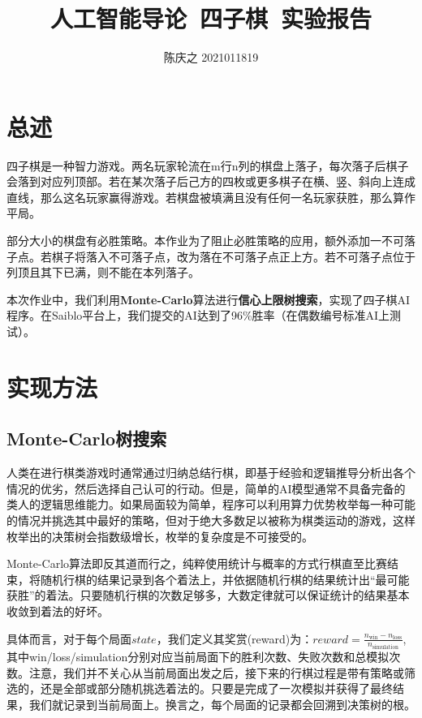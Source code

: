 \documentclass{article}
\title{\textbf{人工智能导论\ 四子棋\ 实验报告}}
\author{陈庆之 2021011819}
\begin{document}
	\maketitle
	
	\section{总述}
	
	四子棋是一种智力游戏。两名玩家轮流在m行n列的棋盘上落子，每次落子后棋子会落到对应列顶部。若在某次落子后己方的四枚或更多棋子在横、竖、斜向上连成直线，那么这名玩家赢得游戏。若棋盘被填满且没有任何一名玩家获胜，那么算作平局。
	
	部分大小的棋盘有必胜策略。本作业为了阻止必胜策略的应用，额外添加一不可落子点。若棋子将落入不可落子点，改为落在不可落子点正上方。若不可落子点位于列顶且其下已满，则不能在本列落子。
	
	本次作业中，我们利用\textbf{Monte-Carlo}算法进行\textbf{信心上限树搜索}，实现了四子棋AI程序。在Saiblo平台上，我们提交的AI达到了96\%胜率（在偶数编号标准AI上测试）。
	
	\section{实现方法}
	
	\subsection{Monte-Carlo树搜索}
	
	人类在进行棋类游戏时通常通过归纳总结行棋，即基于经验和逻辑推导分析出各个情况的优劣，然后选择自己认可的行动。但是，简单的AI模型通常不具备完备的类人的逻辑思维能力。如果局面较为简单，程序可以利用算力优势枚举每一种可能的情况并挑选其中最好的策略，但对于绝大多数足以被称为棋类运动的游戏，这样枚举出的决策树会指数级增长，枚举的复杂度是不可接受的。
	
	Monte-Carlo算法即反其道而行之，纯粹使用统计与概率的方式行棋直至比赛结束，将随机行棋的结果记录到各个着法上，并依据随机行棋的结果统计出“最可能获胜”的着法。只要随机行棋的次数足够多，大数定律就可以保证统计的结果基本收敛到着法的好坏。
	
	具体而言，对于每个局面$state$，我们定义其奖赏(reward)为：$reward = \frac{n_{\text{win}} - n_{\text{loss}}}{n_{\text{simulation}}}$, 其中win/loss/simulation分别对应当前局面下的胜利次数、失败次数和总模拟次数。注意，我们并不关心从当前局面出发之后，接下来的行棋过程是带有策略或筛选的，还是全部或部分随机挑选着法的。只要是完成了一次模拟并获得了最终结果，我们就记录到当前局面上。换言之，每个局面的记录都会回溯到决策树的根。
	
\end{document}
